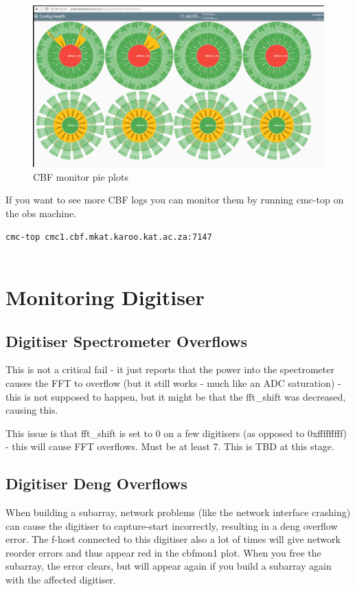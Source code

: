 \begin{figure}[!thb]
	\centering
	\includegraphics[scale=0.23]{Chapters/images/image122.png}
	
	\caption{CBF monitor pie plots}
	\label{fig:image122}
\end{figure}


If you want to see more CBF logs  you can monitor them by running cmc-top on the obs machine.
\begin{lstlisting}[style=DOS]
cmc-top cmc1.cbf.mkat.karoo.kat.ac.za:7147


\end{lstlisting}


\section{ Monitoring Digitiser }
\subsection{ Digitiser Spectrometer Overflows}

This is not a critical fail - it just reports that the power into the spectrometer causes the FFT to overflow (but it still works - much like an ADC saturation) - this is not supposed to happen, but it might be that the fft\_shift was decreased, causing this. 

This issue is that fft\_shift is set to 0 on a few digitisers (as opposed to 0xfffffffff) - this will cause FFT overflows. Must be at least 7. This is TBD at this stage.

\subsection{ Digitiser Deng Overflows}
When building a subarray, network problems (like the network interface crashing) can cause the digitiser to capture-start incorrectly, resulting in a deng overflow error. The f-host connected to this digitiser also a lot of times will give network reorder errors and thus appear red in the cbfmon1 plot. When you free the subarray, the error clears, but will appear again if you build a subarray again with the affected digitiser.

